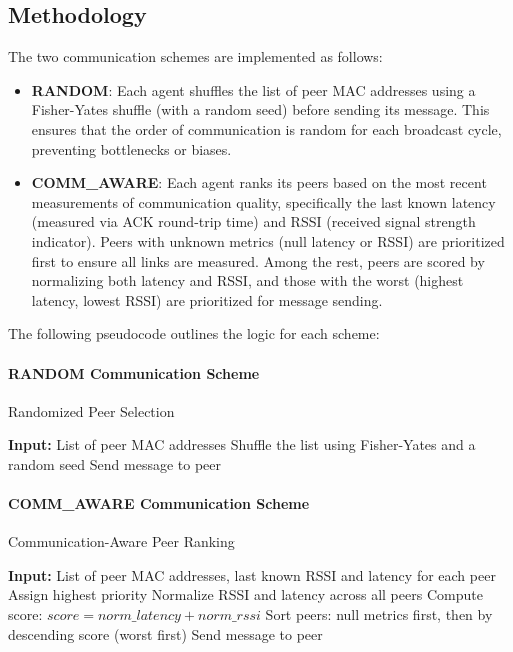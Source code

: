 \documentclass[conference]{IEEEtran}
\begin{document}
\subsection{Methodology}

The two communication schemes are implemented as follows:

\begin{itemize}
    \item \textbf{RANDOM}: Each agent shuffles the list of peer MAC addresses using a Fisher-Yates shuffle (with a random seed) before sending its message. This ensures that the order of communication is random for each broadcast cycle, preventing bottlenecks or biases.
    \item \textbf{COMM\_AWARE}: Each agent ranks its peers based on the most recent measurements of communication quality, specifically the last known latency (measured via ACK round-trip time) and RSSI (received signal strength indicator). Peers with unknown metrics (null latency or RSSI) are prioritized first to ensure all links are measured. Among the rest, peers are scored by normalizing both latency and RSSI, and those with the worst (highest latency, lowest RSSI) are prioritized for message sending.
\end{itemize}

The following pseudocode outlines the logic for each scheme:

\paragraph{RANDOM Communication Scheme}
\begin{algorithm}[H]
\caption{Randomized Peer Selection}
\begin{algorithmic}[1]
\State \textbf{Input:} List of peer MAC addresses
\State Shuffle the list using Fisher-Yates and a random seed
        \State Send message to peer
    \EndIf
\EndFor
\end{algorithmic}
\end{algorithm}

\paragraph{COMM\_AWARE Communication Scheme}
\begin{algorithm}[H]
\caption{Communication-Aware Peer Ranking}
\begin{algorithmic}[1]
\State \textbf{Input:} List of peer MAC addresses, last known RSSI and latency for each peer
        \State Assign highest priority
    \Else
        \State Normalize RSSI and latency across all peers
        \State Compute score: $score = norm\_latency + norm\_rssi$
    \EndIf
\EndFor
\State Sort peers: null metrics first, then by descending score (worst first)
        \State Send message to peer
    \EndIf
\EndFor
\end{algorithmic}
\end{algorithm}
\end{document}
